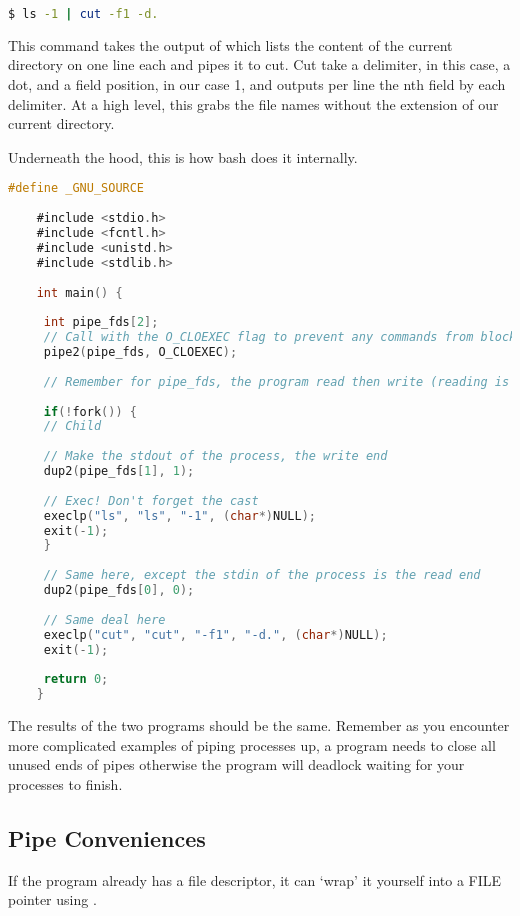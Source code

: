 	\begin{lstlisting}[language=bash]
	$ ls -1 | cut -f1 -d.
	\end{lstlisting}
	 
	This command takes the output of  which lists the content of the current directory on one line each and pipes it to cut.
	Cut take a delimiter, in this case, a dot, and a field position, in our case 1, and outputs per line the nth field by each delimiter.
	At a high level, this grabs the file names without the extension of our current directory.
	 
	Underneath the hood, this is how bash does it internally.
	 
	\begin{lstlisting}[language=C]
	#define _GNU_SOURCE
	 
	#include <stdio.h>
	#include <fcntl.h>
	#include <unistd.h>
	#include <stdlib.h>
	 
	int main() {
	 
	 int pipe_fds[2];
	 // Call with the O_CLOEXEC flag to prevent any commands from blocking
	 pipe2(pipe_fds, O_CLOEXEC);
	 
	 // Remember for pipe_fds, the program read then write (reading is 0 and writing is 1)
	 
	 if(!fork()) {
	 // Child
	 
	 // Make the stdout of the process, the write end
	 dup2(pipe_fds[1], 1);
	 
	 // Exec! Don't forget the cast
	 execlp("ls", "ls", "-1", (char*)NULL);
	 exit(-1);
	 }
	 
	 // Same here, except the stdin of the process is the read end
	 dup2(pipe_fds[0], 0);
	 
	 // Same deal here
	 execlp("cut", "cut", "-f1", "-d.", (char*)NULL);
	 exit(-1);
	 
	 return 0;
	}
	\end{lstlisting}
	 
	The results of the two programs should be the same.
	Remember as you encounter more complicated examples of piping processes up, a program needs to close all unused ends of pipes otherwise the program will deadlock waiting for your processes to finish.
	 
	\subsection{Pipe Conveniences}
	 
	If the program already has a file descriptor, it can `wrap' it yourself into a FILE pointer using .
	 
